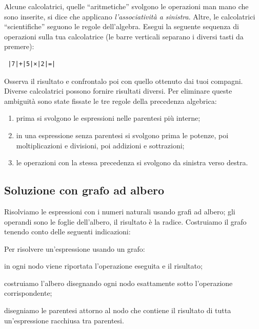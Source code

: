 \osservazione Alcune calcolatrici, quelle ``aritmetiche'' svolgono le 
operazioni man mano che sono inserite, si dice che applicano 
\emph{l'associatività a sinistra}. Altre, le calcolatrici ``scientifiche'' 
seguono le regole dell'algebra. Esegui la seguente sequenza di operazioni 
sulla tua calcolatrice 
(le barre verticali separano i diversi tasti da premere):

\begin{verbatim}
 |7|+|5|×|2|=|
\end{verbatim} 

Osserva il risultato e confrontalo poi con quello ottenuto dai tuoi compagni.
Diverse calcolatrici possono fornire risultati diversi.
Per eliminare queste ambiguità sono state fissate le tre regole della 
precedenza algebrica:

\begin{enumerate}
 \item prima si svolgono le espressioni nelle parentesi più interne; 
 \item in una espressione senza parentesi si svolgono prima le potenze, 
  poi moltiplicazioni e divisioni, poi addizioni e sottrazioni;
 \item le operazioni con la stessa precedenza si svolgono da sinistra verso 
  destra.
\end{enumerate}

\subsection{Soluzione con grafo ad albero}

Risolviamo le espressioni con i numeri naturali usando grafi ad albero;
gli operandi sono le foglie dell'albero, il risultato è la radice. 
Costruiamo il grafo tenendo conto delle seguenti indicazioni:

\begin{procedura}
 Per risolvere un'espressione usando un grafo:
\begin{enumerate*}
 \item in ogni nodo viene riportata l'operazione eseguita e il risultato;
 \item costruiamo l'albero disegnando ogni nodo esattamente sotto
  l'operazione corrispondente;
 \item disegniamo le parentesi attorno al nodo che contiene il
  risultato di tutta un'espressione racchiusa tra parentesi.
\end{enumerate*}
\end{procedura}

